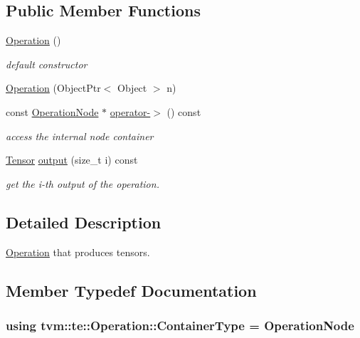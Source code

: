 \subsection*{Public Member Functions}
\begin{DoxyCompactItemize}
\item 
\hyperlink{classtvm_1_1te_1_1Operation_a7bc69f793cb5cbc99bf20fed8617d487}{Operation} ()
\begin{DoxyCompactList}\small\item\em default constructor \end{DoxyCompactList}\item 
\hyperlink{classtvm_1_1te_1_1Operation_a261c64004b4c8712e97f90cb04e135d1}{Operation} (Object\+Ptr$<$ Object $>$ n)
\item 
const \hyperlink{classtvm_1_1te_1_1OperationNode}{Operation\+Node} $\ast$ \hyperlink{classtvm_1_1te_1_1Operation_a1ea2201921213b60f6d5f0318abbb90d}{operator-\/$>$} () const 
\begin{DoxyCompactList}\small\item\em access the internal node container \end{DoxyCompactList}\item 
\hyperlink{classtvm_1_1te_1_1Tensor}{Tensor} \hyperlink{classtvm_1_1te_1_1Operation_a014d606502eab4ae507c5d4290595349}{output} (size\+\_\+t i) const 
\begin{DoxyCompactList}\small\item\em get the i-\/th output of the operation. \end{DoxyCompactList}\end{DoxyCompactItemize}


\subsection{Detailed Description}
\hyperlink{classtvm_1_1te_1_1Operation}{Operation} that produces tensors. 

\subsection{Member Typedef Documentation}
\subsubsection[{\texorpdfstring{Container\+Type}{ContainerType}}]{\setlength{\rightskip}{0pt plus 5cm}using {\bf tvm\+::te\+::\+Operation\+::\+Container\+Type} =  {\bf Operation\+Node}}\hypertarget{classtvm_1_1te_1_1Operation_adf4101428237ffcca42774fad9ba6ef5}{}\label{classtvm_1_1te_1_1Operation_adf4101428237ffcca42774fad9ba6ef5}


